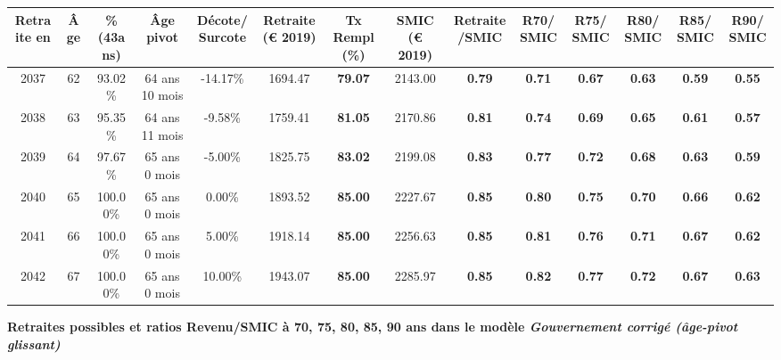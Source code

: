 \begin{adjustbox}{max width=\textwidth} 
\begin{tabular}[htb]{|c|c||c|c|c||c|c||c|c||c|c|c|c|c|} 
\hline 
 Retraite en &  Âge &  \%(43ans) &  Âge pivot &  Décote/Surcote &  Retraite (\euro{} 2019) &  Tx Rempl(\%) &  SMIC (\euro{} 2019) &  Retraite/SMIC &  R70/SMIC &  R75/SMIC &  R80/SMIC &  R85/SMIC &  R90/SMIC \\ 
\hline \hline 
 2037 &  62 &  93.02\% &  64 ans 10 mois &  -14.17\% &  1694.47 &  {\bf 79.07} &  2143.00 &  {\bf {\color{red} 0.79}} &  {\bf {\color{red} 0.71}} &  {\bf {\color{red} 0.67}} &  {\bf {\color{red} 0.63}} &  {\bf {\color{red} 0.59}} &  {\bf {\color{red} 0.55}} \\ 
\hline 
 2038 &  63 &  95.35\% &  64 ans 11 mois &  -9.58\% &  1759.41 &  {\bf 81.05} &  2170.86 &  {\bf {\color{red} 0.81}} &  {\bf {\color{red} 0.74}} &  {\bf {\color{red} 0.69}} &  {\bf {\color{red} 0.65}} &  {\bf {\color{red} 0.61}} &  {\bf {\color{red} 0.57}} \\ 
\hline 
 2039 &  64 &  97.67\% &  65 ans 0 mois &  -5.00\% &  1825.75 &  {\bf 83.02} &  2199.08 &  {\bf {\color{red} 0.83}} &  {\bf {\color{red} 0.77}} &  {\bf {\color{red} 0.72}} &  {\bf {\color{red} 0.68}} &  {\bf {\color{red} 0.63}} &  {\bf {\color{red} 0.59}} \\ 
\hline 
 2040 &  65 &  100.00\% &  65 ans 0 mois &  0.00\% &  1893.52 &  {\bf 85.00} &  2227.67 &  {\bf {\color{red} 0.85}} &  {\bf {\color{red} 0.80}} &  {\bf {\color{red} 0.75}} &  {\bf {\color{red} 0.70}} &  {\bf {\color{red} 0.66}} &  {\bf {\color{red} 0.62}} \\ 
\hline 
 2041 &  66 &  100.00\% &  65 ans 0 mois &  5.00\% &  1918.14 &  {\bf 85.00} &  2256.63 &  {\bf {\color{red} 0.85}} &  {\bf {\color{red} 0.81}} &  {\bf {\color{red} 0.76}} &  {\bf {\color{red} 0.71}} &  {\bf {\color{red} 0.67}} &  {\bf {\color{red} 0.62}} \\ 
\hline 
 2042 &  67 &  100.00\% &  65 ans 0 mois &  10.00\% &  1943.07 &  {\bf 85.00} &  2285.97 &  {\bf {\color{red} 0.85}} &  {\bf {\color{red} 0.82}} &  {\bf {\color{red} 0.77}} &  {\bf {\color{red} 0.72}} &  {\bf {\color{red} 0.67}} &  {\bf {\color{red} 0.63}} \\ 
\hline 
\hline 
\end{tabular} 
\end{adjustbox} 
 
 \vspace{0.1cm} 
{\bf \noindent Retraites possibles et ratios Revenu/SMIC à 70, 75, 80, 85, 90 ans dans le modèle \emph{Gouvernement corrigé (âge-pivot glissant)}}  
 
